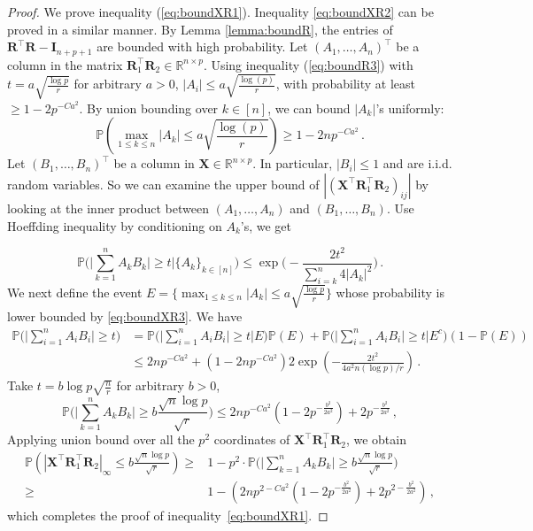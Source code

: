 \documentclass[11pt]{article}
\newcommand{\bX}{\boldsymbol{X}}
\newcommand{\bI}{\boldsymbol{I}}
\newcommand{\bR}{\boldsymbol{R}}
\newcommand{\Prob}{\mathbb{P}}
\begin{document}
\begin{proof} 
We prove inequality (\ref{eq:boundXR1}). Inequality \eqref{eq:boundXR2} can be proved in a similar manner. By Lemma \ref{lemma:boundR}, the entries of $\bR^\top\bR-\bI_{n+p+1}$ are bounded with high probability. Let $(A_1,\dotsc,A_n)^\top$ be a column in the matrix $\bR_1^\top \bR_2\in\mathbb{R}^{n\times p}$. Using inequality (\ref{eq:boundR3}) with $t = a\sqrt{\frac{\log p}{r}}$ for arbitrary $a>0$,  $|A_i|\leq a\sqrt{\frac{\log (p)}{r}}$, with probability at least $\geq 1-2p^{-Ca^2}$. By union bounding over $k\in[n]$, we can bound $|A_k|$'s uniformly:
\begin{equation}\label{eq:boundXR3}
    \Prob\left(\max_{1\leq k\leq n} |A_k|\leq a \sqrt{\frac{\log (p)}{r}}\right)\geq 1-2np^{-Ca^2}\,.
\end{equation}
Let $(B_1,\dotsc,B_n)^\top$ be a column in $\bX\in\mathbb{R}^{n\times p}$. In particular, $|B_i|\leq 1$ and are i.i.d. random variables. So we can examine the upper bound of $|(\bX^\top \bR_1^\top \bR_2)_{ij}|$ by looking at the inner product between $(A_1,\dotsc,A_n)$ and $(B_1,\dotsc,B_n)$. Use Hoeffding inequality by conditioning on $A_k$'s, we get

\[\Prob\bigg(\bigg|\sum_{k=1}^nA_kB_k\bigg|\geq t\bigg|\{A_k\}_{k\in[n]}\bigg)\leq \exp\bigg(-\frac{2t^2}{\sum_{i=k}^n 4|A_k|^2}\bigg)\,.\]
We next define the event $E = \bigg\{\max_{1\leq k\leq n} |A_k|\leq a \sqrt{\frac{\log p}{r}}\bigg\}$ whose probability is lower bounded by \eqref{eq:boundXR3}. We have 
\begin{align*}
    \Prob\bigg(\bigg|\sum_{i=1}^nA_iB_i\bigg|\geq t\bigg) &=  \Prob\bigg(\bigg|\sum_{i=1}^nA_iB_i\bigg|\geq t\bigg|E\bigg)\Prob(E)+\Prob\bigg(\bigg|\sum_{i=1}^nA_iB_i\bigg|\geq t\bigg|E^c\bigg)(1-\Prob(E))\\
        &\le  2np^{-Ca^2}+(1-2np^{-Ca^2})2\exp\left(-\frac{2t^2}{4a^2n(\log p)/r}\right)\,.
\end{align*}
Take $t = b\log p\sqrt{\frac{n}{r}}$ for arbitrary $b>0$,
\[\Prob\bigg(\bigg|\sum_{k=1}^nA_kB_k\bigg|\geq b\frac{\sqrt{n}\log p}{\sqrt{r}}\bigg)\leq  2np^{-Ca^2}(1-2p^{-\frac{b^2}{2a^2}})+2p^{-\frac{b^2}{2a^2}}\,,\]
Applying union bound over all the $p^2$ coordinates of $\bX^\top \bR_1^\top \bR_2$, we obtain
\small
\begin{align*}
    \Prob\left(|\bX^\top \bR_1^\top \bR_2|_\infty\leq b\frac{\sqrt{n}\log p}{\sqrt{r}}\right)\geq & 1-p^2\cdot\Prob\bigg(\bigg|\sum_{k=1}^nA_kB_k\bigg|\geq b\frac{\sqrt{n}\log p}{\sqrt{r}}\bigg)\\
    \geq &1- \left(2np^{2-Ca^2}(1-2p^{-\frac{b^2}{2a^2}})+2p^{2-\frac{b^2}{2a^2}}\right)\,,
\end{align*}
\normalsize
which completes the proof of inequality~\eqref{eq:boundXR1}. 
\end{proof}
\end{document}
